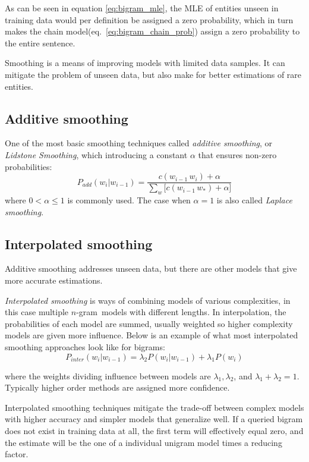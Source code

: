 \documentclass[a4paper,11pt]{kth-mag}
\newcommand{\ngram}{$n$-gram}
\begin{document}
As can be seen in equation \ref{eq:bigram_mle}, the \gls{MLE} of entities unseen in training data would per definition be assigned a zero probability, which in turn makes the chain model(eq.~\ref{eq:bigram_chain_prob}) assign a zero probability to the entire sentence\cite{chen_goodman}.

Smoothing is a means of improving models with limited data samples. It can mitigate the problem of unseen data, but also make for better estimations of rare entities.

\subsection{Additive smoothing}
One of the most basic smoothing techniques called \emph{additive smoothing}, or \emph{Lidstone Smoothing}, which introducing a constant $\alpha$ that ensures non-zero probabilities\cite{chen_goodman}:
\begin{equation} \label{eq:additive_smoothing}
P_{add}(w_i|w_{i-1}) = \frac{c(w_{i-1}\,w_i)+\alpha}{\sum_{w} \big[c(w_{i-1}\, w_*)+\alpha\big]}
\end{equation}
where $0 < \alpha \leq 1$ is commonly used. The case when $\alpha=1$ is also called \emph{Laplace smoothing}\cite{nlp_book}.


\subsection{Interpolated smoothing}
Additive smoothing addresses unseen data, but there are other models that give more accurate estimations.

\emph{Interpolated smoothing} is ways of combining models of various complexities, in this case multiple \ngram~models with different lengths. In interpolation, the probabilities of each model are summed, usually weighted so higher complexity models are given more influence\cite{chen_goodman}.
Below is an example of what most interpolated smoothing approaches look like for bigrams:
\begin{equation}\label{eq:interpolated_smoothing}
  P_{inter}(w_i|w_{i-1}) =
  \lambda_2 P(w_i|w_{i-1}) + \lambda_1 P(w_i)
\end{equation}

where the weights dividing influence between models are $\lambda_1, \lambda_2$, and $\lambda_1 + \lambda_2 = 1$. Typically higher order methods are assigned more confidence.

Interpolated smoothing techniques mitigate the trade-off between complex models with higher accuracy and simpler models that generalize well. If a queried bigram does not exist in training data at all, the first term will effectively equal zero, and the estimate will be the one of a individual unigram model times a reducing factor.
\end{document}
